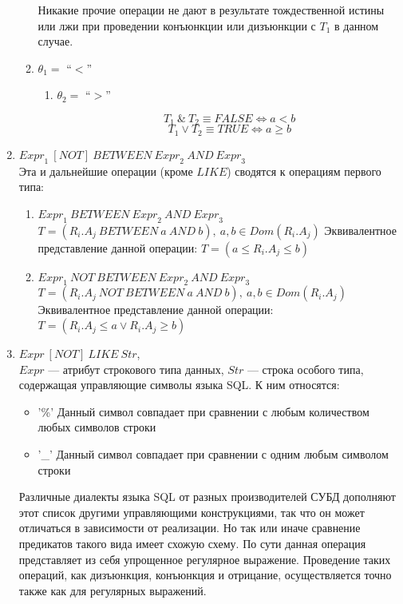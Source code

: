 \documentclass{cmi}
\def \n #1{\mathit{#1}}
\begin{document}
\begin{enumerate}
\begin{enumerate}
		Никакие прочие операции не дают в результате тождественной истины или лжи при проведении конъюнкции или дизъюнкции с $T_1$ в данном случае.
		
		\item $\theta_1 = $ ``$<$''
		\begin{enumerate}
			\item $\theta_2 = $ ``$>$''
			
			$$T_1\ \&\ T_2 \equiv \n{FALSE} \iff a < b$$
			$$T_1 \vee T_2 \equiv \n{TRUE} \iff a \geq b$$
		\end{enumerate}
	\end{enumerate}
	
	
	\item $\n{Expr}_1\ \n{[NOT]}\ \n{BETWEEN}\ \n{Expr}_2\ \n{AND}\ \n{Expr}_3$\\
	Эта и дальнейшие операции (кроме $\n{LIKE}$) сводятся к операциям первого типа:
	\begin{enumerate}
		\item $\n{Expr}_1\ \n{BETWEEN}\ \n{Expr}_2\ \n{AND}\ \n{Expr}_3$\\
		$T = (\n{R_i.A_j}\ \n{BETWEEN}\ a\ \n{AND}\ b),\ a, b \in Dom(R_i.A_j)$
		Эквивалентное представление данной операции: $T = (a \leq \n{R_i.A_j} \leq b)$
		\item $\n{Expr}_1\ \n{NOT}\ \n{BETWEEN}\ \n{Expr}_2\ \n{AND}\ \n{Expr}_3$\\
		$T = (\n{R_i.A_j}\ \n{NOT}\ \n{BETWEEN}\ a\ \n{AND}\ b),\ a, b \in Dom(R_i.A_j)$
		Эквивалентное представление данной операции: $T = (\n{R_i.A_j} \leq a \vee \n{R_i.A_j} \geq b)$
	\end{enumerate}
	
	
	\item $\n{Expr}\ \n{[NOT]}\ \n{LIKE}\ \n{Str}$,\\ $\n{Expr}$ --- атрибут строкового типа данных,
	$\n{Str}$ --- строка особого типа, содержащая управляющие символы языка SQL. К ним относятся:
	\begin{itemize}
		\item '\%' Данный символ совпадает при сравнении с любым количеством любых символов строки
		\item '\_' Данный символ совпадает при сравнении с одним любым символом строки
	\end{itemize}
	
	Различные диалекты языка SQL от разных производителей СУБД дополняют этот список другими
	управляющими конструкциями, так что он может отличаться в зависимости от реализации. Но так или
	иначе сравнение предикатов такого вида имеет схожую схему. По сути данная операция представляет из
	себя упрощенное регулярное выражение. Проведение таких операций, как дизъюнкция, конъюнкция и
	отрицание, осуществляется точно также как для регулярных выражений.
	

\end{enumerate}
\end{document}
